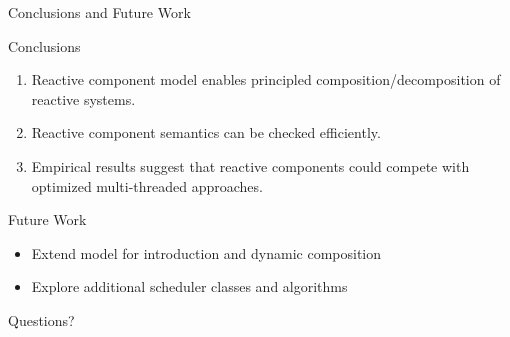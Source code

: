 \documentclass{beamer}
\newcommand{\rcgo}{rc\textsubscript{go}}
\begin{document}
\begin{frame}{Conclusions and Future Work}
  \begin{block}{Conclusions}
    \begin{enumerate}
    \item Reactive component model enables principled composition/decomposition of reactive systems.
    \item Reactive component semantics can be checked efficiently.
    \item Empirical results suggest that reactive components could compete with optimized multi-threaded approaches.
    \end{enumerate}
  \end{block}

  \begin{block}{Future Work}
    \begin{itemize}
    \item Extend model for introduction and dynamic composition
    \item Explore additional scheduler classes and algorithms
    \end{itemize}
  \end{block}
\end{frame}

\begin{frame}
  \centering
  \Huge
  Questions?
\end{frame}





\end{document}
